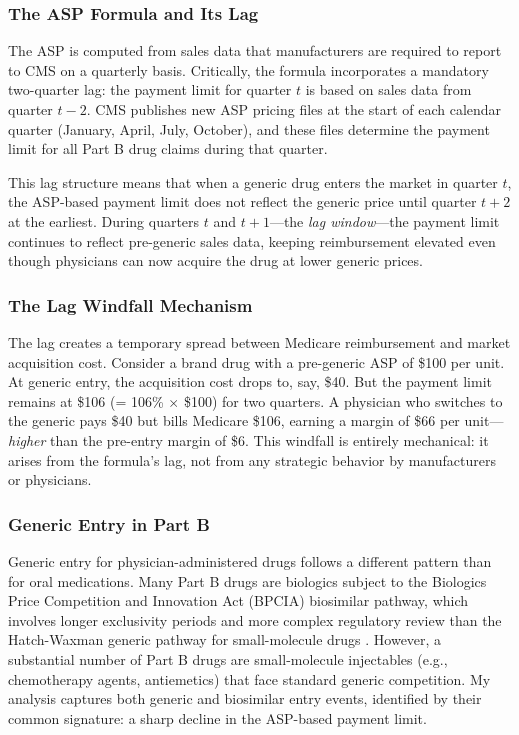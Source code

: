\documentclass[12pt]{article}
\begin{document}
\subsubsection*{The ASP Formula and Its Lag} The ASP is computed from sales data that manufacturers are required to report to CMS on a quarterly basis. Critically, the formula incorporates a mandatory two-quarter lag: the payment limit for quarter $t$ is based on sales data from quarter $t-2$. CMS publishes new ASP pricing files at the start of each calendar quarter (January, April, July, October), and these files determine the payment limit for all Part B drug claims during that quarter.

This lag structure means that when a generic drug enters the market in quarter $t$, the ASP-based payment limit does not reflect the generic price until quarter $t+2$ at the earliest. During quarters $t$ and $t+1$---the \textit{lag window}---the payment limit continues to reflect pre-generic sales data, keeping reimbursement elevated even though physicians can now acquire the drug at lower generic prices.

\subsubsection*{The Lag Windfall Mechanism} The lag creates a temporary spread between Medicare reimbursement and market acquisition cost. Consider a brand drug with a pre-generic ASP of \$100 per unit. At generic entry, the acquisition cost drops to, say, \$40. But the payment limit remains at \$106 (= 106\% $\times$ \$100) for two quarters. A physician who switches to the generic pays \$40 but bills Medicare \$106, earning a margin of \$66 per unit---\textit{higher} than the pre-entry margin of \$6. This windfall is entirely mechanical: it arises from the formula's lag, not from any strategic behavior by manufacturers or physicians.

\subsubsection*{Generic Entry in Part B} Generic entry for physician-administered drugs follows a different pattern than for oral medications. Many Part B drugs are biologics subject to the Biologics Price Competition and Innovation Act (BPCIA) biosimilar pathway, which involves longer exclusivity periods and more complex regulatory review than the Hatch-Waxman generic pathway for small-molecule drugs \citep{frank2007}. However, a substantial number of Part B drugs are small-molecule injectables (e.g., chemotherapy agents, antiemetics) that face standard generic competition. My analysis captures both generic and biosimilar entry events, identified by their common signature: a sharp decline in the ASP-based payment limit.
\end{document}
